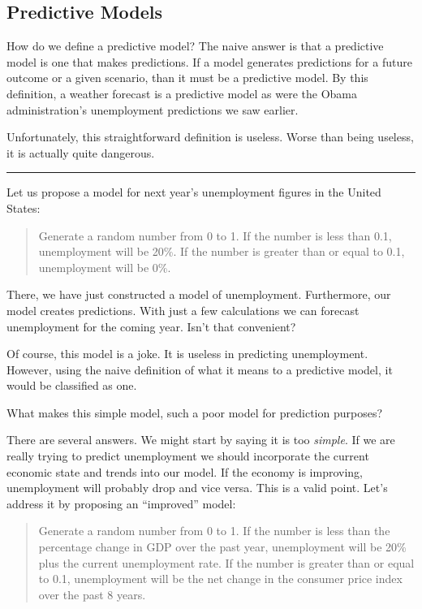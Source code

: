 \documentclass[]{memoir}
\begin{document}
\subsection{Predictive Models}

How do we define a predictive model? The naive answer is that a
predictive model is one that makes predictions. If a model generates
predictions for a future outcome or a given scenario, than it must be a
predictive model. By this definition, a weather forecast is a predictive
model as were the Obama administration's unemployment predictions we saw
earlier.

Unfortunately, this straightforward definition is useless. Worse than
being useless, it is actually quite dangerous.

\begin{center}\rule{3in}{0.4pt}\end{center}

Let us propose a model for next year's unemployment figures in the
United States:

\begin{quote}
Generate a random number from 0 to 1. If the number is less than 0.1,
unemployment will be 20\%. If the number is greater than or equal to
0.1, unemployment will be 0\%.
\end{quote}

There, we have just constructed a model of unemployment. Furthermore,
our model creates predictions. With just a few calculations we can
forecast unemployment for the coming year. Isn't that convenient?

Of course, this model is a joke. It is useless in predicting
unemployment. However, using the naive definition of what it means to a
predictive model, it would be classified as one.

What makes this simple model, such a poor model for prediction purposes?

There are several answers. We might start by saying it is too
\emph{simple}. If we are really trying to predict unemployment we should
incorporate the current economic state and trends into our model. If the
economy is improving, unemployment will probably drop and vice versa.
This is a valid point. Let's address it by proposing an ``improved''
model:

\begin{quote}
Generate a random number from 0 to 1. If the number is less than the
percentage change in GDP over the past year, unemployment will be 20\%
plus the current unemployment rate. If the number is greater than or
equal to 0.1, unemployment will be the net change in the consumer price
index over the past 8 years.
\end{quote}
\end{document}
